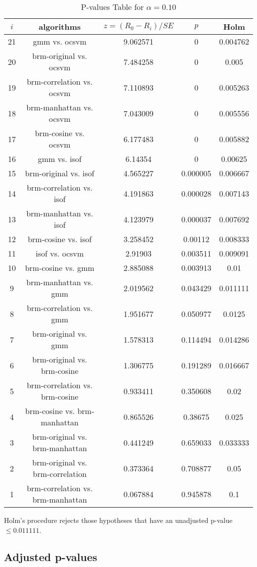 \documentclass[a4paper,10pt]{article}
\begin{document}
\begin{landscape}
\begin{table}[!htp]
\centering\scriptsize
\begin{tabular}{ccccc}
$i$&algorithms&$z=(R_0 - R_i)/SE$&$p$&Holm\\
\hline21&gmm vs. ocsvm&9.062571&0&0.004762\\
20&brm-original vs. ocsvm&7.484258&0&0.005\\
19&brm-correlation vs. ocsvm&7.110893&0&0.005263\\
18&brm-manhattan vs. ocsvm&7.043009&0&0.005556\\
17&brm-cosine vs. ocsvm&6.177483&0&0.005882\\
16&gmm vs. isof&6.14354&0&0.00625\\
15&brm-original vs. isof&4.565227&0.000005&0.006667\\
14&brm-correlation vs. isof&4.191863&0.000028&0.007143\\
13&brm-manhattan vs. isof&4.123979&0.000037&0.007692\\
12&brm-cosine vs. isof&3.258452&0.00112&0.008333\\
11&isof vs. ocsvm&2.91903&0.003511&0.009091\\
10&brm-cosine vs. gmm&2.885088&0.003913&0.01\\
9&brm-manhattan vs. gmm&2.019562&0.043429&0.011111\\
8&brm-correlation vs. gmm&1.951677&0.050977&0.0125\\
7&brm-original vs. gmm&1.578313&0.114494&0.014286\\
6&brm-original vs. brm-cosine&1.306775&0.191289&0.016667\\
5&brm-correlation vs. brm-cosine&0.933411&0.350608&0.02\\
4&brm-cosine vs. brm-manhattan&0.865526&0.38675&0.025\\
3&brm-original vs. brm-manhattan&0.441249&0.659033&0.033333\\
2&brm-original vs. brm-correlation&0.373364&0.708877&0.05\\
1&brm-correlation vs. brm-manhattan&0.067884&0.945878&0.1\\
\hline
\end{tabular}
\caption{P-values Table for $\alpha=0.10$}
\end{table}Holm's procedure rejects those hypotheses that have an unadjusted p-value $\le0.011111$.

\pagebreak

\subsection{Adjusted p-values}


\end{landscape}
\end{document}
